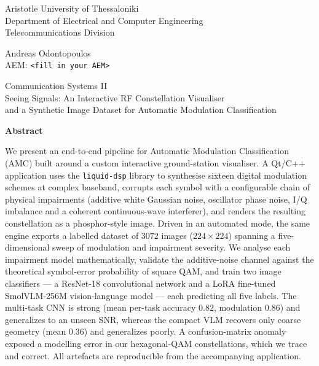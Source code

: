 \documentclass[11pt,a4paper,onecolumn,final]{article}
\begin{document}
\thispagestyle{empty}
{\sffamily\centering\Large

\vspace{\fill}

{\Large Aristotle University of Thessaloniki\\
Department of Electrical and Computer Engineering\\
Telecommunications Division}\\[0.5cm]


\vspace{2.0cm}

{\LARGE Andreas Odontopoulos}\\[0.3em]
{\normalsize AEM: \texttt{<fill in your AEM>}}

\vspace{3.5cm}


{\LARGE Communication Systems II}\\[1em]

{\large Seeing Signals: An Interactive RF Constellation Visualiser\\[0.2em]
and a Synthetic Image Dataset for Automatic Modulation Classification}

\vspace{3.5cm}


%
}

\newpage


\begin{center}{\large\bfseries Abstract}\end{center}
\noindent We present an end-to-end pipeline for Automatic Modulation Classification (AMC)
built around a custom interactive ground-station visualiser. A Qt/C++ application uses the
\texttt{liquid-dsp} library to synthesise sixteen digital modulation schemes at complex
baseband, corrupts each symbol with a configurable chain of physical impairments (additive
white Gaussian noise, oscillator phase noise, I/Q imbalance and a coherent continuous-wave
interferer), and renders the resulting constellation as a phosphor-style image. Driven in
an automated mode, the same engine exports a labelled dataset of $3072$ images
($224\times224$) spanning a five-dimensional sweep of modulation and impairment severity.
We analyse each impairment model mathematically, validate the additive-noise channel
against the theoretical symbol-error probability of square QAM, and train two image
classifiers --- a ResNet-18 convolutional network and a LoRA fine-tuned SmolVLM-256M
vision-language model --- each predicting all five labels. The multi-task CNN is strong (mean
per-task accuracy $0.82$, modulation $0.86$) and generalizes to an unseen SNR, whereas the
compact VLM recovers only coarse geometry (mean $0.36$) and generalizes poorly. A
confusion-matrix anomaly exposed a modelling error in our hexagonal-QAM constellations, which
we trace and correct. All artefacts are reproducible from the accompanying application.
\end{document}

